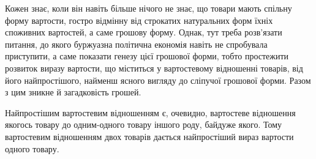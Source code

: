 Кожен знає, коли він навіть більше нічого не знає, що товари
мають спільну форму вартости, гостро відмінну від строкатих натуральних
форм їхніх споживних вартостей, а саме грошову
форму. Однак, тут треба розв’язати питання, до якого буржуазна
політична економія навіть не спробувала приступити, а саме
показати генезу цієї грошової форми, тобто простежити розвиток
виразу вартости, що міститься у вартостевому відношенні товарів,
від його найпростішого, найменш ясного вигляду до сліпучої
грошової форми. Разом з цим зникне й загадковість грошей.

Найпростішим вартостевим відношенням є, очевидно, вартостеве
відношення якогось товару до одним-одного товару
іншого роду, байдуже якого. Тому вартостевим відношенням двох
товарів дається найпростіший вираз вартости одного товару.
